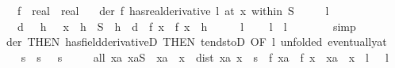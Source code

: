 \begin{isabellebody}
\ \ \ f\ {\isacharcolon}{\kern0pt}{\isacharcolon}{\kern0pt}\ {\isachardoublequoteopen}real\ {\isasymRightarrow}\ real{\isachardoublequoteclose}\isanewline
\ \ \ der{\isacharcolon}{\kern0pt}\ {\isachardoublequoteopen}{\isacharparenleft}{\kern0pt}f\ has{\isacharunderscore}{\kern0pt}real{\isacharunderscore}{\kern0pt}derivative\ l{\isacharparenright}{\kern0pt}\ {\isacharparenleft}{\kern0pt}at\ x\ within\ S{\isacharparenright}{\kern0pt}{\isachardoublequoteclose}\isanewline
\ \ \ \ \ {\isachardoublequoteopen}l\ {\isacharless}{\kern0pt}\ {}{\isachardoublequoteclose}\isanewline
\ \ \ {\isachardoublequoteopen}{\isasymexists}d\ {\isachargreater}{\kern0pt}\ {}{\isachardot}{\kern0pt}\ {\isasymforall}h\ {\isachargreater}{\kern0pt}\ {}{\isachardot}{\kern0pt}\ x\ {\isacharminus}{\kern0pt}\ h\ {\isasymin}\ S\ {\isasymlongrightarrow}\ h\ {\isacharless}{\kern0pt}\ d\ {\isasymlongrightarrow}\ f\ x\ {\isacharless}{\kern0pt}\ f\ {\isacharparenleft}{\kern0pt}x\ {\isacharminus}{\kern0pt}\ h{\isacharparenright}{\kern0pt}{\isachardoublequoteclose}\isanewline
%
\isadelimproof
%
\endisadelimproof
%
\isatagproof
{}\isamarkupfalse%
\ {\isacharminus}{\kern0pt}\isanewline
\ \ \isamarkupfalse%
\ {\isacartoucheopen}l\ {\isacharless}{\kern0pt}\ {}{\isacartoucheclose}\ \isamarkupfalse%
\ l{\isacharcolon}{\kern0pt}\ {\isachardoublequoteopen}{\isacharminus}{\kern0pt}\ l\ {\isachargreater}{\kern0pt}\ {}{\isachardoublequoteclose}\isanewline
\ \ \ \ \isamarkupfalse%
\ simp\isanewline
\ \ \isamarkupfalse%
\ der\ {\isacharbrackleft}{\kern0pt}THEN\ has{\isacharunderscore}{\kern0pt}field{\isacharunderscore}{\kern0pt}derivativeD{\isacharcomma}{\kern0pt}\ THEN\ tendstoD{\isacharcomma}{\kern0pt}\ OF\ l{\isacharcomma}{\kern0pt}\ unfolded\ eventually{\isacharunderscore}{\kern0pt}at{\isacharbrackright}{\kern0pt}\isanewline
\ \ \isamarkupfalse%
\ s\ \ s{\isacharcolon}{\kern0pt}\ {\isachardoublequoteopen}{}\ {\isacharless}{\kern0pt}\ s{\isachardoublequoteclose}\isanewline
\ \ \ \ \ all{\isacharcolon}{\kern0pt}\ {\isachardoublequoteopen}{\isasymAnd}xa{\isachardot}{\kern0pt}\ xa{\isasymin}S\ {\isasymLongrightarrow}\ xa\ {\isasymnoteq}\ x\ {\isasymand}\ dist\ xa\ x\ {\isacharless}{\kern0pt}\ s\ {\isasymlongrightarrow}\ {\isasymbar}{\isacharparenleft}{\kern0pt}f\ xa\ {\isacharminus}{\kern0pt}\ f\ x{\isacharparenright}{\kern0pt}\ {\isacharslash}{\kern0pt}\ {\isacharparenleft}{\kern0pt}xa\ {\isacharminus}{\kern0pt}\ x{\isacharparenright}{\kern0pt}\ {\isacharminus}{\kern0pt}\ l{\isasymbar}\ {\isacharless}{\kern0pt}\ {\isacharminus}{\kern0pt}\ l{\isachardoublequoteclose}\isanewline

\end{isabellebody}
